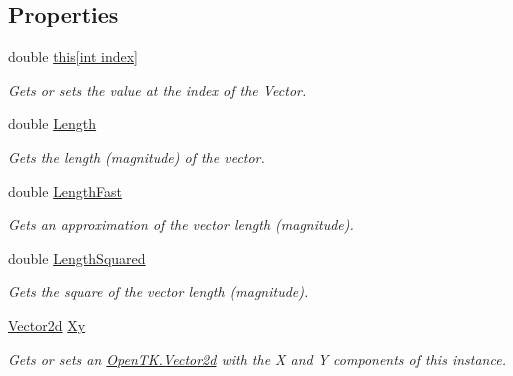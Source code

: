 \subsection*{Properties}
\begin{DoxyCompactItemize}
\item 
double \hyperlink{struct_open_t_k_1_1_vector4d_a7d7ef511863616a944237df2b6d4a898}{this\mbox{[}int index\mbox{]}}
\begin{DoxyCompactList}\small\item\em Gets or sets the value at the index of the Vector. \end{DoxyCompactList}\item 
double \hyperlink{struct_open_t_k_1_1_vector4d_ab9f920535e4630430c8b2a6affcdb6a4}{Length}
\begin{DoxyCompactList}\small\item\em Gets the length (magnitude) of the vector. \end{DoxyCompactList}\item 
double \hyperlink{struct_open_t_k_1_1_vector4d_a2d8389c0eab7152b136e96a89d9c6d19}{Length\-Fast}
\begin{DoxyCompactList}\small\item\em Gets an approximation of the vector length (magnitude). \end{DoxyCompactList}\item 
double \hyperlink{struct_open_t_k_1_1_vector4d_a359d864d15d2f2fd790fd2577bb04ec1}{Length\-Squared}
\begin{DoxyCompactList}\small\item\em Gets the square of the vector length (magnitude). \end{DoxyCompactList}\item 
\hyperlink{struct_open_t_k_1_1_vector2d}{Vector2d} \hyperlink{struct_open_t_k_1_1_vector4d_abe07a639c5388fdeb6428426487ba426}{Xy}
\begin{DoxyCompactList}\small\item\em Gets or sets an \hyperlink{struct_open_t_k_1_1_vector2d}{Open\-T\-K.\-Vector2d} with the X and Y components of this instance. \end{DoxyCompactList}\item 

\end{DoxyCompactItemize}
